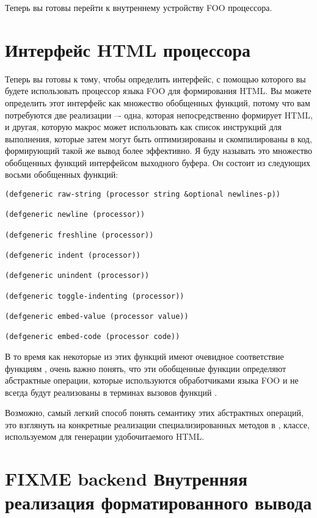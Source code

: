 Теперь вы готовы перейти к внутреннему устройству FOO процессора. 

\section{Интерфейс HTML процессора}

Теперь вы готовы к тому, чтобы определить интерфейс, с помощью которого вы будете
использовать процессор языка FOO для формирования HTML. Вы можете определить этот
интерфейс как множество обобщенных функций, потому что вам потребуются две реализации –-
одна, которая непосредственно формирует HTML, и другая, которую макрос  может
использовать как список инструкций для выполнения, которые затем могут быть оптимизированы
и скомпилированы в код, формирующий такой же вывод более эффективно. Я буду называть это
множество обобщенных функций интерфейсом выходного буфера. Он состоит из следующих восьми
обобщенных функций:

\begin{lstlisting}
(defgeneric raw-string (processor string &optional newlines-p))

(defgeneric newline (processor))

(defgeneric freshline (processor))

(defgeneric indent (processor))

(defgeneric unindent (processor))

(defgeneric toggle-indenting (processor))

(defgeneric embed-value (processor value))

(defgeneric embed-code (processor code))
\end{lstlisting}

В то время как некоторые из этих функций имеют очевидное соответствие функциям
, очень важно понять, что эти обобщенные функции определяют
абстрактные операции, которые используются обработчиками языка FOO и не всегда будут
реализованы в терминах вызовов функций .

Возможно, самый легкий способ понять семантику этих абстрактных операций, это взглянуть на
конкретные реализации специализированных методов в , классе,
используемом для генерации удобочитаемого HTML.

\section{FIXME backend Внутренняя реализация форматированного вывода}

